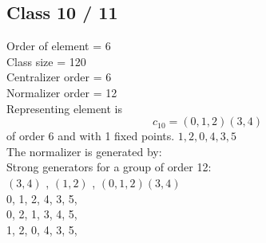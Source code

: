 \subsection*{Class 10 / 11}
Order of element = 6\\
Class size = 120\\
Centralizer order = 6\\
Normalizer order = 12\\
Representing element is
$$c_{10} = 
(0, 1, 2)(3, 4)$$
of order $6$ and with 1 fixed points.
$1,2,0,4,3,5$\\
The normalizer is generated by:\\
Strong generators for a group of order 12:\\
$
(3, 4)$
, 
$
(1, 2)$
, 
$
(0, 1, 2)(3, 4)$
\\
0, 1, 2, 4, 3, 5, \\
0, 2, 1, 3, 4, 5, \\
1, 2, 0, 4, 3, 5, \\


